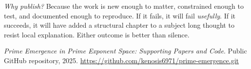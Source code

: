 \documentclass[11pt]{article}
\theoremstyle{plain}
\theoremstyle{definition}
\begin{document}
\medskip
\noindent
\emph{Why publish?} Because the work is new enough to matter, constrained enough to test, and documented enough to reproduce. If it fails, it will fail \emph{usefully}. If it succeeds, it will have added a structural chapter to a subject long thought to resist local explanation. Either outcome is better than silence.

\begin{thebibliography}{9}

\newblock \emph{Prime Emergence in Prime Exponent Space: Supporting Papers and Code}.
\newblock Public GitHub repository, 2025.
\newblock \url{https://github.com/kenosis6971/prime-emergence.git}

\end{thebibliography}
\end{document}
